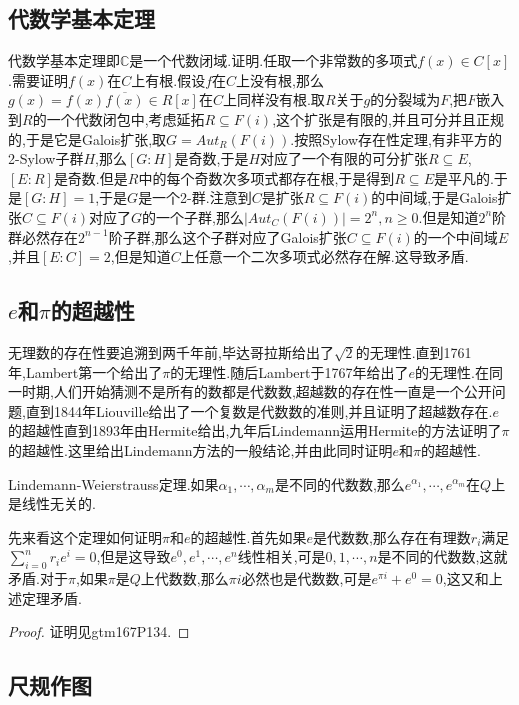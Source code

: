 \subsection{代数学基本定理}

代数学基本定理即$\mathbb{C}$是一个代数闭域.证明.任取一个非常数的多项式$f(x)\in C[x]$.需要证明$f(x)$在$C$上有根.假设$f$在$C$上没有根,那么$g(x)=f(x)\overline{f(x)}\in R[x]$在$C$上同样没有根.取$R$关于$g$的分裂域为$F$,把$F$嵌入到$R$的一个代数闭包中,考虑延拓$R\subseteq F(i)$,这个扩张是有限的,并且可分并且正规的,于是它是Galois扩张,取$G=Aut_R(F(i))$.按照Sylow存在性定理,有非平方的2-Sylow子群$H$,那么$[G:H]$是奇数,于是$H$对应了一个有限的可分扩张$R\subseteq E$,$[E:R]$是奇数.但是$R$中的每个奇数次多项式都存在根,于是得到$R\subseteq E$是平凡的.于是$[G:H]=1$,于是$G$是一个2-群.注意到$C$是扩张$R\subseteq F(i)$的中间域,于是Galois扩张$C\subseteq F(i)$对应了$G$的一个子群,那么$|Aut_C(F(i))|=2^n,n\ge0$.但是知道$2^n$阶群必然存在$2^{n-1}$阶子群,那么这个子群对应了Galois扩张$C\subseteq F(i)$的一个中间域$E$,并且$[E:C]=2$,但是知道$C$上任意一个二次多项式必然存在解.这导致矛盾.
\newpage
\subsection{$e$和$\pi$的超越性}

无理数的存在性要追溯到两千年前,毕达哥拉斯给出了$\sqrt{2}$的无理性.直到1761年,Lambert第一个给出了$\pi$的无理性.随后Lambert于1767年给出了$e$的无理性.在同一时期,人们开始猜测不是所有的数都是代数数,超越数的存在性一直是一个公开问题,直到1844年Liouville给出了一个复数是代数数的准则,并且证明了超越数存在.$e$的超越性直到1893年由Hermite给出,九年后Lindemann运用Hermite的方法证明了$\pi$的超越性.这里给出Lindemann方法的一般结论,并由此同时证明$e$和$\pi$的超越性.

Lindemann-Weierstrauss定理.如果$\alpha_1,\cdots,\alpha_m$是不同的代数数,那么$e^{\alpha_1},\cdots,e^{\alpha_m}$在$Q$上是线性无关的.

先来看这个定理如何证明$\pi$和$e$的超越性.首先如果$e$是代数数,那么存在有理数$r_i$满足$\sum_{i=0}^{n}r_ie^i=0$,但是这导致$e^0,e^1,\cdots,e^n$线性相关,可是$0,1,\cdots,n$是不同的代数数,这就矛盾.对于$\pi$,如果$\pi$是$Q$上代数数,那么$\pi i$必然也是代数数,可是$e^{\pi i}+e^0=0$,这又和上述定理矛盾.

\begin{proof}
	
	证明见gtm167P134.
	
\end{proof}
\newpage
\subsection{尺规作图}

